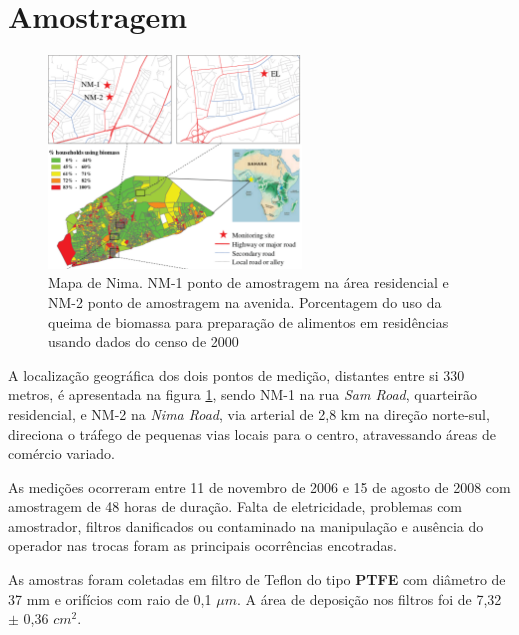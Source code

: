 \section{Amostragem}


\begin{figure}[H]
\begin{center}
  \includegraphics[width=0.6\textwidth]{../inputs/images/zheng/nima_mapa.pdf}
  \caption{Mapa de Nima. NM-1 ponto de amostragem na área residencial e 
           NM-2 ponto de amostragem na avenida. Porcentagem do uso da queima
           de biomassa para preparação de alimentos em residências usando dados
           do censo de 2000 \citep{ghanacensus2003} \label{fig:nima_mapa}}
\end{center}
\end{figure}

A localização geográfica dos dois pontos de medição, distantes entre si 330
metros, é apresentada na figura
\ref{fig:nima_mapa}, sendo NM-1 na rua \textit{Sam Road}, quarteirão residencial,
e NM-2 na \textit{Nima Road}, via arterial de 2,8 km na direção norte-sul, 
direciona o tráfego de pequenas vias locais para o centro, atravessando áreas de 
comércio variado. 

As medições ocorreram entre 11 de novembro de 2006 e 15 de agosto de 2008 com 
amostragem de 48 horas de duração. Falta de eletricidade, problemas com 
amostrador, filtros danificados ou contaminado na manipulação e ausência do 
operador nas trocas foram as principais ocorrências encotradas. 

As amostras foram coletadas em filtro de Teflon do tipo \textbf{PTFE} 
com diâmetro de 37 mm e orifícios com raio de 0,1 $\mu m$. A área de deposição 
nos filtros foi de 7,32 $\pm$ 0,36 $cm^2$.

